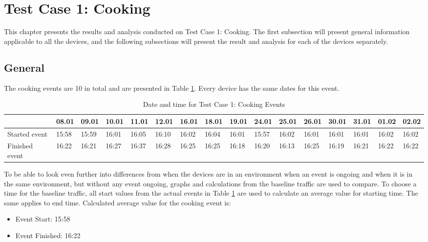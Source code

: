 \section{Test Case 1: Cooking}
This chapter presents the results and analysis conducted on Test Case 1: Cooking. The first subsection will present general information applicable to all the devices, and the following subsections will present the result and analysis for each of the devices separately. 
\subsection{General}
The cooking events are 10 in total and are presented in Table \ref{tab:CookingDates}. Every device has the same dates for this event. 
\begin{table}[!hbtp]
    \centering
    \caption{Date and time for Test Case 1: Cooking Events}
    \begin{adjustbox}{width=1\textwidth}
            \begin{tabular}{l|l|l|l|l|l|l|l|l|l|l|l|l|l|l|l|}
            \cline{2-16} 
            & 08.01 & 09.01 & 10.01 & 11.01 & 12.01 & 16.01 & 18.01 & 19.01 & 24.01 & 25.01 & 26.01 & 30.01 & 31.01 & 01.02 & 02.02 \\
            \hline
            \multicolumn{1}{|l|}{Started event}  & 15:58 & 15:59 & 16:01 & 16:05 & 16:10 & 16:02 & 16:04 & 16:01 & 15:57 & 16:02 & 16:01 & 16:01 & 16:01 & 16:02 & 16:02 \\ 
            \hline
            \multicolumn{1}{|l|}{Finished event} & 16:22 & 16:21 & 16:27 & 16:37 & 16:28 & 16:25 & 16:25 & 16:18 & 16:20 & 16:13 & 16:25 & 16:19 & 16:21 & 16:22 & 16:22 \\ 
            \hline
            \end{tabular}
    \end{adjustbox}
    \label{tab:CookingDates}
\end{table}
\FloatBarrier

To be able to look even further into differences from when the devices are in an environment when an event is ongoing and when it is in the same environment, but without any event ongoing, graphs and calculations from the baseline traffic are used to compare. To choose a time for the baseline traffic, all start values from the actual events in Table \ref{tab:CookingDates} are used to calculate an average value for starting time. The same applies to end time. Calculated average value for the cooking event is:

\begin{itemize}
    \item Event Start: 15:58
    \item Event Finished: 16:22
\end{itemize}
\newpage

